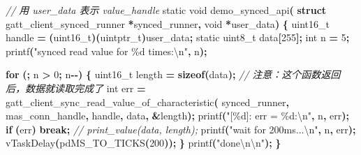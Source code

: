 \documentclass[
  12pt,
]{book}
\newenvironment{Shaded}{\begin{snugshade}}{\end{snugshade}}
\newcommand{\CommentTok}[1]{\textcolor[rgb]{0.56,0.35,0.01}{\textit{#1}}}
\newcommand{\ControlFlowTok}[1]{\textcolor[rgb]{0.13,0.29,0.53}{\textbf{#1}}}
\newcommand{\DataTypeTok}[1]{\textcolor[rgb]{0.13,0.29,0.53}{#1}}
\newcommand{\DecValTok}[1]{\textcolor[rgb]{0.00,0.00,0.81}{#1}}
\newcommand{\KeywordTok}[1]{\textcolor[rgb]{0.13,0.29,0.53}{\textbf{#1}}}
\newcommand{\NormalTok}[1]{#1}
\newcommand{\OperatorTok}[1]{\textcolor[rgb]{0.81,0.36,0.00}{\textbf{#1}}}
\newcommand{\SpecialCharTok}[1]{\textcolor[rgb]{0.00,0.00,0.00}{#1}}
\newcommand{\StringTok}[1]{\textcolor[rgb]{0.31,0.60,0.02}{#1}}
\begin{document}
\begin{Shaded}
\begin{Highlighting}[]
\CommentTok{// 用 user\_data 表示 value\_handle}
\DataTypeTok{static} \DataTypeTok{void}\NormalTok{ demo\_synced\_api}\OperatorTok{(}
    \KeywordTok{struct}\NormalTok{ gatt\_client\_synced\_runner }\OperatorTok{*}\NormalTok{synced\_runner}\OperatorTok{,}
    \DataTypeTok{void} \OperatorTok{*}\NormalTok{user\_data}\OperatorTok{)}
\OperatorTok{\{}
    \DataTypeTok{uint16\_t}\NormalTok{ handle }\OperatorTok{=} \OperatorTok{(}\DataTypeTok{uint16\_t}\OperatorTok{)(}\DataTypeTok{uintptr\_t}\OperatorTok{)}\NormalTok{user\_data}\OperatorTok{;}
    \DataTypeTok{static} \DataTypeTok{uint8\_t}\NormalTok{ data}\OperatorTok{[}\DecValTok{255}\OperatorTok{];}
    \DataTypeTok{int}\NormalTok{ n }\OperatorTok{=} \DecValTok{5}\OperatorTok{;}
\NormalTok{    printf}\OperatorTok{(}\StringTok{"synced read value for \%d times:}\SpecialCharTok{\textbackslash{}n}\StringTok{"}\OperatorTok{,}\NormalTok{ n}\OperatorTok{);}

    \ControlFlowTok{for} \OperatorTok{(;}\NormalTok{ n }\OperatorTok{\textgreater{}} \DecValTok{0}\OperatorTok{;}\NormalTok{ n}\OperatorTok{{-}{-})}
    \OperatorTok{\{}
        \DataTypeTok{uint16\_t}\NormalTok{ length }\OperatorTok{=} \KeywordTok{sizeof}\OperatorTok{(}\NormalTok{data}\OperatorTok{);}
        \CommentTok{// 注意：这个函数返回后，数据就读取完成了}
        \DataTypeTok{int}\NormalTok{ err }\OperatorTok{=}\NormalTok{ gatt\_client\_sync\_read\_value\_of\_characteristic}\OperatorTok{(}
\NormalTok{                synced\_runner}\OperatorTok{,}\NormalTok{ mas\_conn\_handle}\OperatorTok{,}\NormalTok{ handle}\OperatorTok{,}
\NormalTok{                data}\OperatorTok{,} \OperatorTok{\&}\NormalTok{length}\OperatorTok{);}
\NormalTok{        printf}\OperatorTok{(}\StringTok{"[\%d]: err = \%d:}\SpecialCharTok{\textbackslash{}n}\StringTok{"}\OperatorTok{,}\NormalTok{ n}\OperatorTok{,}\NormalTok{ err}\OperatorTok{);}
        \ControlFlowTok{if} \OperatorTok{(}\NormalTok{err}\OperatorTok{)} \ControlFlowTok{break}\OperatorTok{;}
        \CommentTok{// print\_value(data, length);}
\NormalTok{        printf}\OperatorTok{(}\StringTok{"wait for 200ms...}\SpecialCharTok{\textbackslash{}n}\StringTok{"}\OperatorTok{,}\NormalTok{ n}\OperatorTok{,}\NormalTok{ err}\OperatorTok{);}
\NormalTok{        vTaskDelay}\OperatorTok{(}\NormalTok{pdMS\_TO\_TICKS}\OperatorTok{(}\DecValTok{200}\OperatorTok{));}
    \OperatorTok{\}}
\NormalTok{    printf}\OperatorTok{(}\StringTok{"done}\SpecialCharTok{\textbackslash{}n\textbackslash{}n}\StringTok{"}\OperatorTok{);}
\OperatorTok{\}}
\end{Highlighting}
\end{Shaded}
\end{document}
